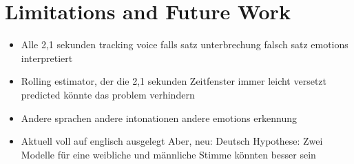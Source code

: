 \section{Limitations and Future Work}
\label{sec:limitations_and_future_work}
\begin{itemize}
    \item Alle 2,1 sekunden tracking voice
falls satz unterbrechung
falsch satz emotions interpretiert
\item Rolling estimator, der die 2,1 sekunden Zeitfenster immer leicht versetzt predicted könnte das problem verhindern
\item Andere sprachen
andere intonationen
andere emotions erkennung
\item Aktuell voll auf englisch ausgelegt
Aber, neu: Deutsch
Hypothese: Zwei Modelle für eine weibliche und männliche Stimme könnten besser sein
\end{itemize}
